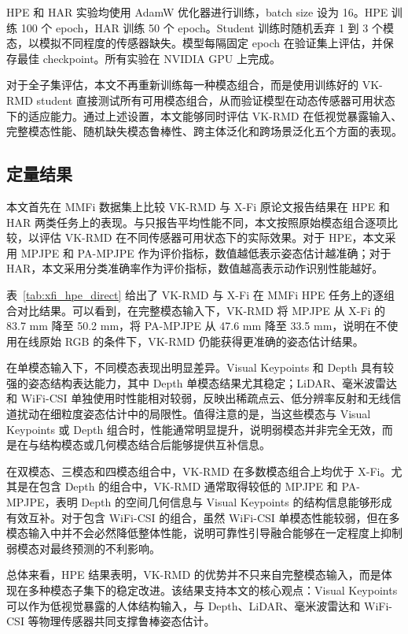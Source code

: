 \documentclass[journal]{IEEEtran}
\newcommand{\parahead}[1]{\vspace{0.4em}\noindent{\textbf{#1}}}
\begin{document}
HPE 和 HAR 实验均使用 AdamW 优化器进行训练，batch size 设为 16。HPE 训练 100 个 epoch，HAR 训练 50 个 epoch。Student 训练时随机丢弃 1 到 3 个模态，以模拟不同程度的传感器缺失。模型每隔固定 epoch 在验证集上评估，并保存最佳 checkpoint。所有实验在 NVIDIA GPU 上完成。

对于全子集评估，本文不再重新训练每一种模态组合，而是使用训练好的 VK-RMD student 直接测试所有可用模态组合，从而验证模型在动态传感器可用状态下的适应能力。通过上述设置，本文能够同时评估 VK-RMD 在低视觉暴露输入、完整模态性能、随机缺失模态鲁棒性、跨主体泛化和跨场景泛化五个方面的表现。


\subsection{定量结果}

本文首先在 MMFi 数据集上比较 VK-RMD 与 X-Fi 原论文报告结果在 HPE 和 HAR 两类任务上的表现。与只报告平均性能不同，本文按照原始模态组合逐项比较，以评估 VK-RMD 在不同传感器可用状态下的实际效果。对于 HPE，本文采用 MPJPE 和 PA-MPJPE 作为评价指标，数值越低表示姿态估计越准确；对于 HAR，本文采用分类准确率作为评价指标，数值越高表示动作识别性能越好。

\parahead{人体姿态估计。}
表~\ref{tab:xfi_hpe_direct} 给出了 VK-RMD 与 X-Fi 在 MMFi HPE 任务上的逐组合对比结果。可以看到，在完整模态输入下，VK-RMD 将 MPJPE 从 X-Fi 的 83.7 mm 降至 50.2 mm，将 PA-MPJPE 从 47.6 mm 降至 33.5 mm，说明在不使用在线原始 RGB 的条件下，VK-RMD 仍能获得更准确的姿态估计结果。

在单模态输入下，不同模态表现出明显差异。Visual Keypoints 和 Depth 具有较强的姿态结构表达能力，其中 Depth 单模态结果尤其稳定；LiDAR、毫米波雷达和 WiFi-CSI 单独使用时性能相对较弱，反映出稀疏点云、低分辨率反射和无线信道扰动在细粒度姿态估计中的局限性。值得注意的是，当这些模态与 Visual Keypoints 或 Depth 组合时，性能通常明显提升，说明弱模态并非完全无效，而是在与结构模态或几何模态结合后能够提供互补信息。

在双模态、三模态和四模态组合中，VK-RMD 在多数模态组合上均优于 X-Fi。尤其是在包含 Depth 的组合中，VK-RMD 通常取得较低的 MPJPE 和 PA-MPJPE，表明 Depth 的空间几何信息与 Visual Keypoints 的结构信息能够形成有效互补。对于包含 WiFi-CSI 的组合，虽然 WiFi-CSI 单模态性能较弱，但在多模态输入中并不会必然降低整体性能，说明可靠性引导融合能够在一定程度上抑制弱模态对最终预测的不利影响。

总体来看，HPE 结果表明，VK-RMD 的优势并不只来自完整模态输入，而是体现在多种模态子集下的稳定改进。该结果支持本文的核心观点：Visual Keypoints 可以作为低视觉暴露的人体结构输入，与 Depth、LiDAR、毫米波雷达和 WiFi-CSI 等物理传感器共同支撑鲁棒姿态估计。
\end{document}
